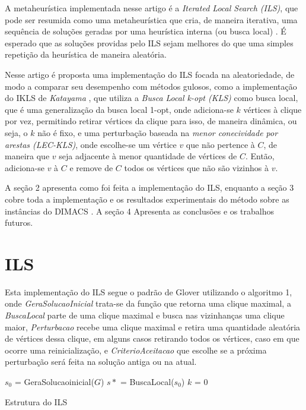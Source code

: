 \documentclass{article}
\begin{document}
A metaheurística implementada nesse artigo é a \textit{Iterated Local Search (ILS)}, que pode ser resumida como uma metaheurística que cria, de maneira iterativa, uma sequência de soluções geradas por uma heurística interna (ou busca local) \cite{handbook}. É esperado que as soluções providas pelo ILS sejam melhores do que uma simples repetição da heurística de maneira aleatória.

Nesse artigo é proposta uma implementação do ILS focada na aleatoriedade, de modo a comparar seu desempenho com métodos gulosos, como a implementação do IKLS de \textit{Katayama} \cite{kopt}, que utiliza a \textit{Busca Local k-opt (KLS)} \cite{KLS} como busca local, que é uma generalização da busca local 1-opt, onde adiciona-se $k$ vértices à clique por vez, permitindo retirar vértices da clique para isso, de maneira dinâmica, ou seja, o $k$ não é fixo,  e uma perturbação baseada na \textit{menor conecividade por arestas (LEC-KLS)}, onde escolhe-se um vértice $v$ que não pertence à $C$, de maneira que $v$ seja adjacente à menor quantidade de vértices de $C$. Então, adiciona-se $v$  à $C$ e remove de $C$ todos os vértices que não são vizinhos à $v$.\par

A seção 2 apresenta como foi feita a implementação do ILS, enquanto a seção 3 cobre toda a implementação e os resultados experimentais do método sobre as instâncias do DIMACS \cite{DIMACS2}. A seção 4 Apresenta as conclusões e os trabalhos futuros.

\section{ILS}


Esta implementação do ILS segue o padrão de Glover \cite{handbook} utilizando o algoritmo 1, onde \textit{GeraSolucaoInicial} trata-se da função que retorna uma clique maximal, a \textit{BuscaLocal} parte de uma clique maximal e busca nas vizinhanças uma clique maior, \textit{Perturbacao} recebe uma clique maximal e retira uma quantidade aleatória de vértices dessa clique, em alguns casos retirando todos os vértices, caso em que ocorre uma reinicialização, e \textit{CriterioAceitacao} que escolhe se a próxima perturbação será feita na solução antiga ou na atual.\par


\begin{algorithm}
 $s_0$ = GeraSolucaoinicial($G$)\;
 $s*$ = BuscaLocal($s_0$)\;
 $k$ = 0\;
 \caption{Estrutura do ILS}
\end{algorithm}
\end{document}
